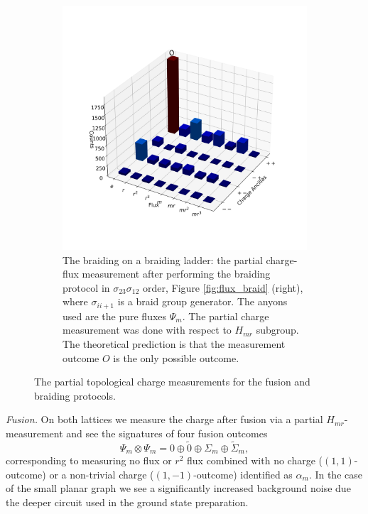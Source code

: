 \documentclass[two column]{article}
\begin{document}
\begin{figure}
\begin{subfigure}{0.47\textwidth}
    \includegraphics[width=\linewidth]{Figures/braid_link.png}
    \caption{The braiding on a braiding ladder: the partial charge-flux measurement after performing the braiding protocol in $\sigma_{23}\sigma_{12}$ order, Figure \ref{fig:flux_braid} (right), where $\sigma_{ii+1}$ is a braid group generator. The anyons used are the pure fluxes $\Psi_m$. The partial charge measurement was done with respect to $H_{mr}$ subgroup. The theoretical prediction is that the measurement outcome $O$ is the only possible outcome.}
    \label{fig:braid_link}
\end{subfigure}
\caption{The partial topological charge measurements for the fusion and braiding protocols.}
\label{fig:red_charge_res}
\end{figure}

\emph{Fusion.} 
On both lattices we measure the charge after fusion via a partial $H_{mr}$-measurement and see the signatures of four fusion outcomes
$$\Psi_m \otimes \Psi_m = 0 \oplus \tilde 0 \oplus \Sigma_m \oplus \tilde{\Sigma}_m,$$
corresponding to measuring no flux or $r^2$ flux combined with no charge ($(1,1)$-outcome) or a non-trivial charge ($(1,-1)$-outcome) identified as $\alpha_m$.
In the case of the small planar graph we see a significantly 
increased background noise due the deeper circuit used in the ground state preparation.
\end{document}
